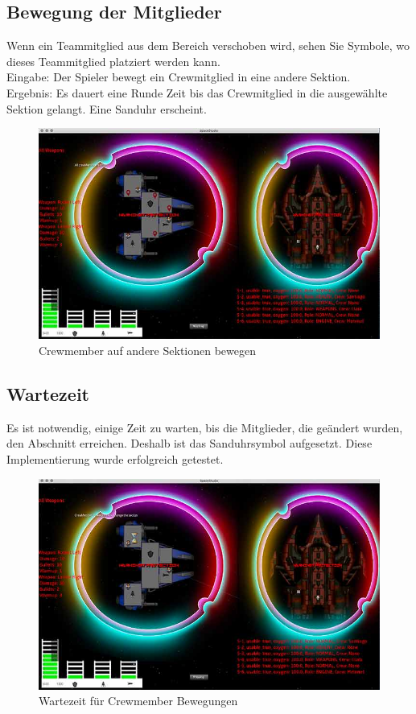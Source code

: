 \documentclass[12pt]{article}
\begin{document}
\subsection{Bewegung der Mitglieder}
Wenn ein Teammitglied aus dem Bereich verschoben wird, sehen Sie Symbole, wo dieses Teammitglied platziert werden kann.\\
Eingabe: Der Spieler bewegt ein Crewmitglied in eine andere Sektion.\\
Ergebnis: Es dauert eine Runde Zeit bis das Crewmitglied in die ausgewählte Sektion gelangt. Eine Sanduhr erscheint.\\
\begin{figure}[htp]
\centering
\includegraphics[scale=0.6]{TestProtocolBilder/crewmemberpull@0,25x.jpg}
\caption{Crewmember auf andere Sektionen bewegen}
\end{figure}
\newpage
\subsection{Wartezeit}
Es ist notwendig, einige Zeit zu warten, bis die Mitglieder, die geändert wurden, den Abschnitt erreichen. Deshalb ist das Sanduhrsymbol aufgesetzt. Diese Implementierung wurde erfolgreich getestet.
\begin{figure}[htp]
\centering
\includegraphics[scale=0.6]{TestProtocolBilder/timewaiting@0,25x.jpg}
\caption{Wartezeit für Crewmember Bewegungen}
\end{figure}
\newpage
\end{document}
